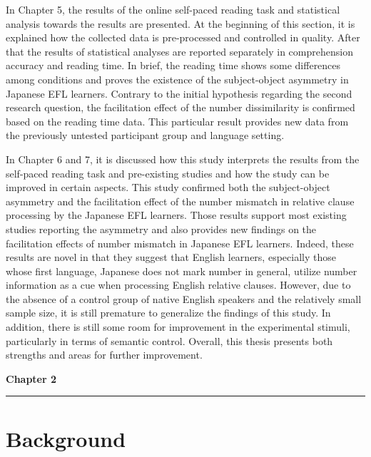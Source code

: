 \documentclass[
]{article}
\begin{document}
In Chapter 5, the results of the online self-paced reading task and
statistical analysis towards the results are presented. At the beginning
of this section, it is explained how the collected data is pre-processed
and controlled in quality. After that the results of statistical
analyses are reported separately in comprehension accuracy and reading
time. In brief, the reading time shows some differences among conditions
and proves the existence of the subject-object asymmetry in Japanese EFL
learners. Contrary to the initial hypothesis regarding the second
research question, the facilitation effect of the number dissimilarity
is confirmed based on the reading time data. This particular result
provides new data from the previously untested participant group and
language setting.

In Chapter 6 and 7, it is discussed how this study interprets the
results from the self-paced reading task and pre-existing studies and
how the study can be improved in certain aspects. This study confirmed
both the subject-object asymmetry and the facilitation effect of the
number mismatch in relative clause processing by the Japanese EFL
learners. Those results support most existing studies reporting the
asymmetry and also provides new findings on the facilitation effects of
number mismatch in Japanese EFL learners. Indeed, these results are
novel in that they suggest that English learners, especially those whose
first language, Japanese does not mark number in general, utilize number
information as a cue when processing English relative clauses. However,
due to the absence of a control group of native English speakers and the
relatively small sample size, it is still premature to generalize the
findings of this study. In addition, there is still some room for
improvement in the experimental stimuli, particularly in terms of
semantic control. Overall, this thesis presents both strengths and areas
for further improvement.

\newpage

\clearpage
\thispagestyle{empty}  %
\vspace*{-1cm}
\begin{flushleft}
\Huge \textbf{Chapter 2}
\end{flushleft}
\vspace{0.3cm}
\noindent\rule{\linewidth}{0.6pt}
\pagestyle{fancy}  %

\section{Background}\label{background}
\end{document}
